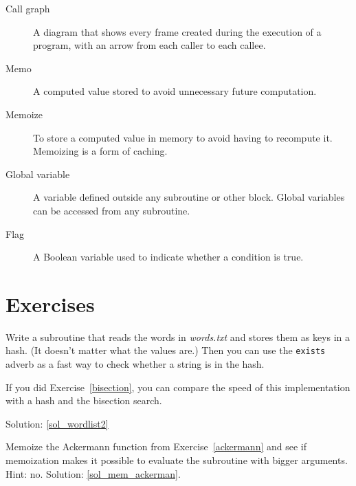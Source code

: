 \begin{description}
\item[Call graph] A diagram that shows every frame created during
the execution of a program, with an arrow from each caller to
each callee. 

\item[Memo] A computed value stored to avoid unnecessary future 
computation.

\item[Memoize] To store a computed value in memory to avoid having 
to recompute it. Memoizing is a form of caching.

\item[Global variable]  A variable defined outside any 
subroutine or other block.  Global variables can be 
accessed from any subroutine.

\item[Flag] A Boolean variable used to indicate whether a condition
is true.

\end{description}


\section{Exercises}

\begin{exercise}
\label{wordlist2}

Write a subroutine that reads the words in \emph{words.txt} and
stores them as keys in a hash.  (It doesn't matter what the
values are.)  Then you can use the {\tt exists} adverb
as a fast way to check whether a string is in
the hash.

If you did Exercise~\ref{bisection}, you can compare the speed
of this implementation with a hash and the bisection search.

Solution: \ref{sol_wordlist2}

\end{exercise}


\begin{exercise}
\label{mem_ackerman}
Memoize the Ackermann function from Exercise~\ref{ackermann} 
and see if memoization makes it possible to evaluate the 
subroutine with bigger arguments.  Hint: no.
Solution: \ref{sol_mem_ackerman}.

\end{exercise}



